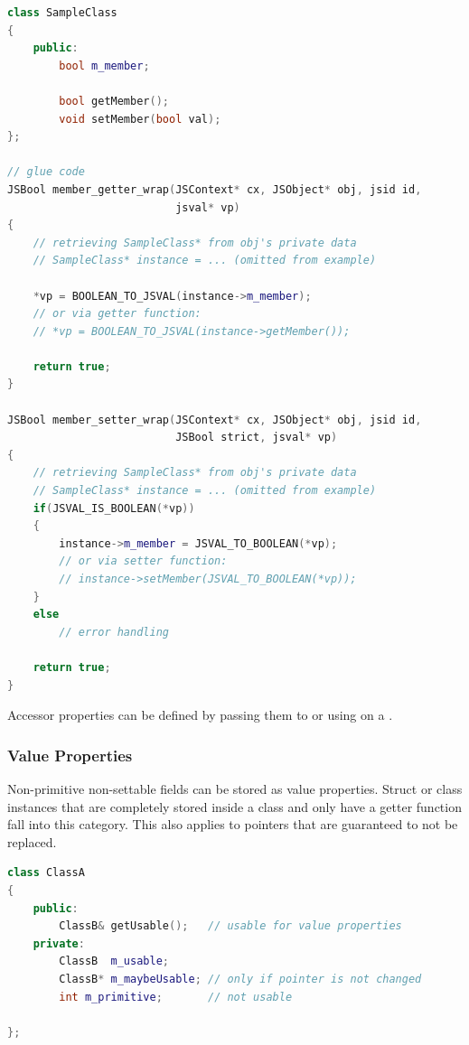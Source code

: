 \newpage
\SingleSpacing
\begin{lstlisting}[language=C++, caption=Glue code for accessor properties, label=lst:GlueAccessor]
class SampleClass
{
	public:
		bool m_member;
		
		bool getMember();
		void setMember(bool val);
};

// glue code
JSBool member_getter_wrap(JSContext* cx, JSObject* obj, jsid id, 
                          jsval* vp)
{
	// retrieving SampleClass* from obj's private data
	// SampleClass* instance = ... (omitted from example)
	
	*vp = BOOLEAN_TO_JSVAL(instance->m_member);
	// or via getter function: 		
	// *vp = BOOLEAN_TO_JSVAL(instance->getMember());

	return true;
}

JSBool member_setter_wrap(JSContext* cx, JSObject* obj, jsid id, 
                          JSBool strict, jsval* vp)
{
	// retrieving SampleClass* from obj's private data
	// SampleClass* instance = ... (omitted from example)
	if(JSVAL_IS_BOOLEAN(*vp))
	{
		instance->m_member = JSVAL_TO_BOOLEAN(*vp);
		// or via setter function: 		
		// instance->setMember(JSVAL_TO_BOOLEAN(*vp));
	}
	else
		// error handling

	return true;
}
\end{lstlisting}
\OnehalfSpacing

Accessor properties can be defined by passing them to  or using \linebreak{} on a .

\newpage
\subsubsection{Value Properties}
\label{sec:ValueProperties}

Non-primitive non-settable fields can be stored as value properties. Struct or class instances that are completely stored inside a class and only have a getter function fall into this category. This also applies to pointers that are guaranteed to not be replaced.

\SingleSpacing
\begin{lstlisting}[language=C++, caption=Fields usable for value properties]
class ClassA
{
	public:
		ClassB& getUsable();   // usable for value properties
	private:
		ClassB  m_usable;  
		ClassB* m_maybeUsable; // only if pointer is not changed
		int m_primitive;       // not usable

};
\end{lstlisting}
\OnehalfSpacing

